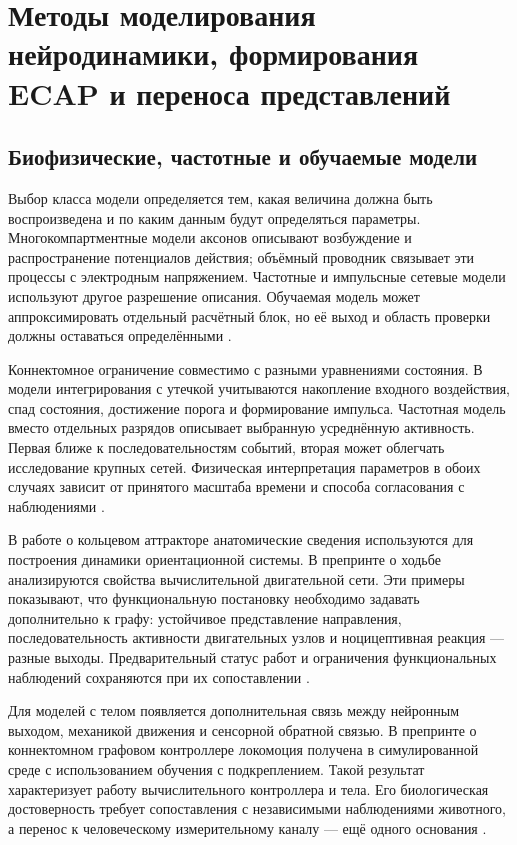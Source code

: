 \section{Методы моделирования нейродинамики, формирования ECAP и переноса представлений}
\label{sec:models-transfer}

\subsection{Биофизические, частотные и обучаемые модели}

Выбор класса модели определяется тем, какая величина должна быть воспроизведена и по каким данным будут определяться параметры. Многокомпартментные модели аксонов описывают возбуждение и распространение потенциалов действия; объёмный проводник связывает эти процессы с электродным напряжением. Частотные и импульсные сетевые модели используют другое разрешение описания. Обучаемая модель может аппроксимировать отдельный расчётный блок, но её выход и область проверки должны оставаться определёнными \cite{ecapmodel,s285}.

Коннектомное ограничение совместимо с разными уравнениями состояния. В модели интегрирования с утечкой учитываются накопление входного воздействия, спад состояния, достижение порога и формирование импульса. Частотная модель вместо отдельных разрядов описывает выбранную усреднённую активность. Первая ближе к последовательностям событий, вторая может облегчать исследование крупных сетей. Физическая интерпретация параметров в обоих случаях зависит от принятого масштаба времени и способа согласования с наблюдениями \cite{s775,s212}.

В работе о кольцевом аттракторе анатомические сведения используются для построения динамики ориентационной системы. В препринте о ходьбе анализируются свойства вычислительной двигательной сети. Эти примеры показывают, что функциональную постановку необходимо задавать дополнительно к графу: устойчивое представление направления, последовательность активности двигательных узлов и ноцицептивная реакция --- разные выходы. Предварительный статус работ и ограничения функциональных наблюдений сохраняются при их сопоставлении \cite{s900,s909}.

Для моделей с телом появляется дополнительная связь между нейронным выходом, механикой движения и сенсорной обратной связью. В препринте о коннектомном графовом контроллере локомоция получена в симулированной среде с использованием обучения с подкреплением. Такой результат характеризует работу вычислительного контроллера и тела. Его биологическая достоверность требует сопоставления с независимыми наблюдениями животного, а перенос к человеческому измерительному каналу --- ещё одного основания \cite{s286}.

